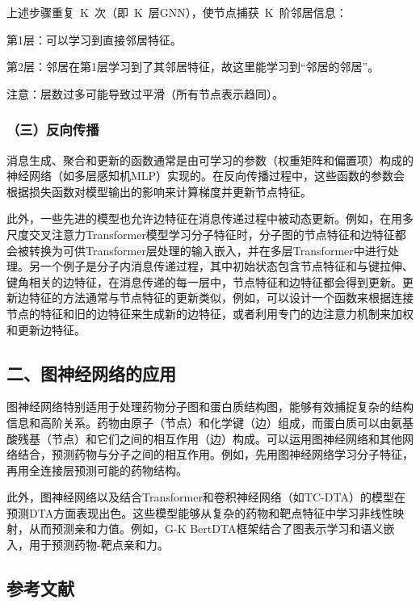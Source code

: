 上述步骤重复~K~次（即~K~层GNN），使节点捕获~K~阶邻居信息：

第1层：可以学习到直接邻居特征。

第2层：邻居在第1层学习到了其邻居特征，故这里能学习到``邻居的邻居''。

注意：层数过多可能导致过平滑（所有节点表示趋同）。

\hypertarget{ux4e09ux53cdux5411ux4f20ux64ad}{%
\subsubsection{（三）反向传播}\label{ux4e09ux53cdux5411ux4f20ux64ad}}

消息生成、聚合和更新的函数通常是由可学习的参数（权重矩阵和偏置项）构成的神经网络（如多层感知机MLP）实现的。在反向传播过程中，这些函数的参数会根据损失函数对模型输出的影响来计算梯度并更新节点特征。

此外，一些先进的模型也允许边特征在消息传递过程中被动态更新。例如，在用多尺度交叉注意力Transformer模型学习分子特征时，分子图的节点特征和边特征都会被转换为可供Transformer层处理的输入嵌入，并在多层Transformer中进行处理。另一个例子是分子内消息传递过程，其中初始状态包含节点特征和与键拉伸、键角相关的边特征，在消息传递的每一层中，节点特征和边特征都会得到更新。更新边特征的方法通常与节点特征的更新类似，例如，可以设计一个函数来根据连接节点的特征和旧的边特征来生成新的边特征，或者利用专门的边注意力机制来加权和更新边特征。

\hypertarget{ux4e8cux56feux795eux7ecfux7f51ux7edcux7684ux5e94ux7528}{%
\subsection{二、图神经网络的应用}\label{ux4e8cux56feux795eux7ecfux7f51ux7edcux7684ux5e94ux7528}}

图神经网络特别适用于处理药物分子图和蛋白质结构图，能够有效捕捉复杂的结构信息和高阶关系。药物由原子（节点）和化学键（边）组成，而蛋白质可以由氨基酸残基（节点）和它们之间的相互作用（边）构成。可以运用图神经网络和其他网络结合，预测药物与分子之间的相互作用。例如，先用图神经网络学习分子特征，再用全连接层预测可能的药物结构。

此外，图神经网络以及结合Transformer和卷积神经网络（如TC-DTA）的模型在预测DTA方面表现出色。这些模型能够从复杂的药物和靶点特征中学习非线性映射，从而预测亲和力值。例如，G-K BertDTA框架结合了图表示学习和语义嵌入，用于预测药物-靶点亲和力。

\FloatBarrier
{}
\hypertarget{ux53c2ux8003ux6587ux732e-41}{%
\subsection{参考文献}\label{ux53c2ux8003ux6587ux732e-41}}

